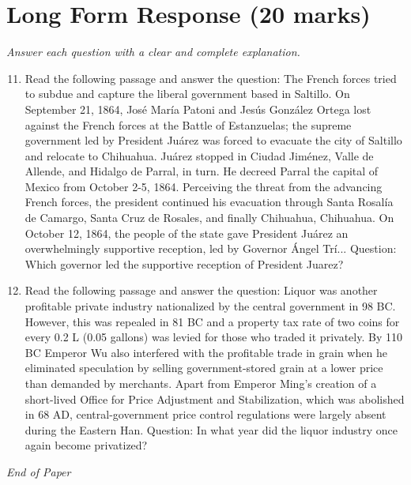 \documentclass[12pt]{article}
\begin{document}
\section*{Long Form Response (20 marks)}
\textit{Answer each question with a clear and complete explanation.}
\begin{enumerate}[label=\arabic*.]
\setcounter{enumi}{10}
\item Read the following passage and answer the question: The French forces tried to subdue and capture the liberal government based in Saltillo. On September 21, 1864, José María Patoni and Jesús González Ortega lost against the French forces at the Battle of Estanzuelas; the supreme government led by President Juárez was forced to evacuate the city of Saltillo and relocate to Chihuahua. Juárez stopped in Ciudad Jiménez, Valle de Allende, and Hidalgo de Parral, in turn. He decreed Parral the capital of Mexico from October 2-5, 1864. Perceiving the threat from the advancing French forces, the president continued his evacuation through Santa Rosalía de Camargo, Santa Cruz de Rosales, and finally Chihuahua, Chihuahua. On October 12, 1864, the people of the state gave President Juárez an overwhelmingly supportive reception, led by Governor Ángel Trí... Question: Which governor led the supportive reception of President Juarez?
\item Read the following passage and answer the question: Liquor was another profitable private industry nationalized by the central government in 98 BC. However, this was repealed in 81 BC and a property tax rate of two coins for every 0.2 L (0.05 gallons) was levied for those who traded it privately. By 110 BC Emperor Wu also interfered with the profitable trade in grain when he eliminated speculation by selling government-stored grain at a lower price than demanded by merchants. Apart from Emperor Ming's creation of a short-lived Office for Price Adjustment and Stabilization, which was abolished in 68 AD, central-government price control regulations were largely absent during the Eastern Han. Question: In what year did the liquor industry once again become privatized?
\end{enumerate}

\vfill
\noindent\textit{End of Paper}
\end{document}

